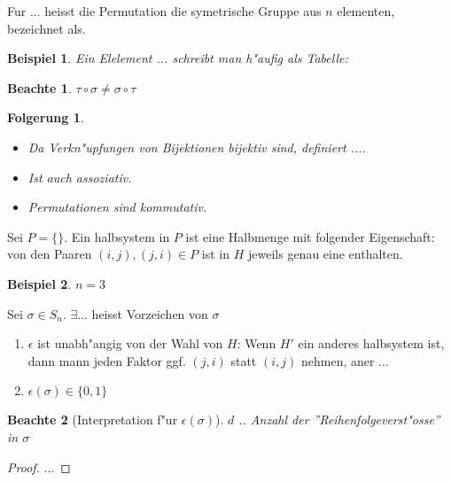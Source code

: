\documentclass[11pt]{article}
\newtheorem{exa}{Beispiel}[section]
\newtheorem{folgerung}{Folgerung}
\newtheorem*{notte}{Beachte}
\begin{document}
\begin{definition}
  Fur  ... heisst die Permutation die symetrische Gruppe aus $n$ elementen,
  bezeichnet als.
\end{definition}

\begin{exa}
  Ein Elelement ... schreibt man h"aufig als Tabelle:
\end{exa}

\begin{notte}
  $\tau\circ\sigma \not= \sigma\circ\tau$
\end{notte}

\begin{folgerung}
  \begin{itemize}
  \item   Da Verkn"upfungen von Bijektionen bijektiv sind, definiert ....
  \item Ist auch assoziativ.
  \item  Permutationen sind kommutativ.
  \end{itemize}
\end{folgerung}

\begin{definition}
  Sei $P=\{\}$. Ein halbsystem in $P$ ist eine Halbmenge mit folgender
  Eigenschaft: von den Paaren $(i,j), (j,i)\in P$ ist in $H$ jeweils genau eine enthalten.
\end{definition}

\begin{exa}
  $n=3$
\end{exa}

\begin{definition}
  Sei $\sigma\in S_n$. $\exists$... heisst Vorzeichen von $\sigma$
  \begin{enumerate}
  \item $\epsilon$ ist unabh"angig von der Wahl von $H$: Wenn $H'$ ein anderes
    halbsystem ist, dann mann jeden Faktor ggf. $(j,i)$ statt $(i,j)$ nehmen,
    aner ... 
  \item $\epsilon(\sigma) \in \{0, 1\}$
  \end{enumerate}
\end{definition}

\begin{notte}[Interpretation f"ur $\epsilon (\sigma)$]
  $d$ .. Anzahl der ''Reihenfolgeverst"osse'' in $\sigma$
\end{notte}
\begin{proof}
  ...
\end{proof}
\end{document}
